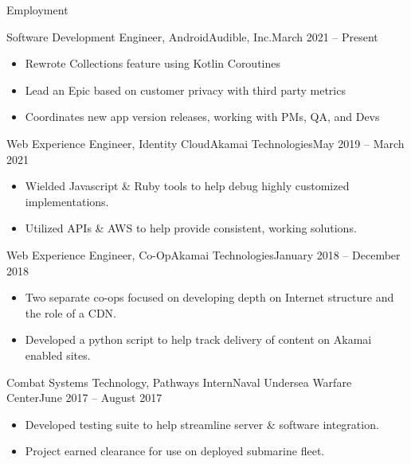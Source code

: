 \documentclass[]{mcdowellcv}
\begin{document}
	\makeheader
	
	\begin{cvsection}{Employment}
		\begin{cvsubsection}{Software Development Engineer, Android}{Audible, Inc.}{March 2021 -- Present}
		\vspace{2mm}
			\begin{itemize}
				\item Rewrote Collections feature using Kotlin Coroutines
				\item Lead an Epic based on customer privacy with third party metrics
				\item Coordinates new app version releases, working with PMs, QA, and Devs
			\end{itemize}
		\end{cvsubsection}
		\begin{cvsubsection}{Web Experience Engineer, Identity Cloud}{Akamai Technologies}{May 2019 -- March 2021}
		\vspace{2mm}
			\begin{itemize}
				\item Wielded Javascript \& Ruby tools to help debug highly customized implementations.
				\item Utilized APIs \& AWS to help provide consistent, working solutions.
			\end{itemize}
		\end{cvsubsection}
		
		\begin{cvsubsection}{Web Experience Engineer, Co-Op}{Akamai Technologies}{January 2018 -- December 2018}
		\vspace{2mm}
			\begin{itemize}
				\item Two separate co-ops focused on developing depth on Internet structure and the role of a CDN.
				\item Developed a python script to help track delivery of content on Akamai enabled sites.
			\end{itemize}
		\end{cvsubsection}
		
		\begin{cvsubsection}{Combat Systems Technology, Pathways Intern}{Naval Undersea Warfare Center}{June 2017 -- August 2017}
		\vspace{2mm}
			\begin{itemize}
				\item Developed testing suite to help streamline server \& software integration.
				\item Project earned clearance for use on deployed submarine fleet.
			\end{itemize}
		\end{cvsubsection}
		
	\end{cvsection}
	
\end{document}
